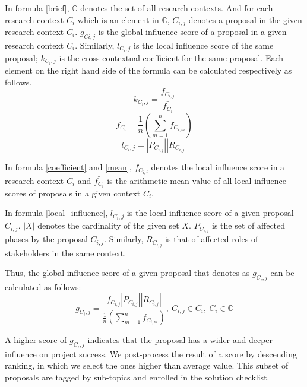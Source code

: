 In formula \ref{brief}, $\mathbb{C}$ denotes the set of all research contexts. And for each research context $C_{i}$ which is an element in $\mathbb{C}$, $C_{i,j}$ denotes a proposal in the given research context $C_{i}$. $g_{Ci,j}$ is the global influence score of a proposal in a given research context $C_{i}$. Similarly, $l_{C_{i},j}$ is the local influence score of the same proposal; $\mathit{k_{C_{i},j}}$ is the cross-contextual coefficient for the same proposal. Each element on the right hand side of the formula can be calculated respectively as follows.
\begin{equation}
\mathit{k_{C_{i},j}} = \frac{f_{C_{i,j}}}{\bar{f_{C_i}}}
\label{coefficient}
\end{equation}
\begin{equation}
\bar{f_{C_i}} = \frac{1}{n}\left (\sum_{m=1}^n{f_{C_{i,m}}}\right)
\label{mean}
\end{equation}
\begin{equation}
l_{C_{i},j} = |P_{C_{i,j}}||R_{C_{i,j}}|
\label{local_influence}
\end{equation}

In formula \ref{coefficient} and \ref{mean}, $f_{C_{i,j}}$ denotes the local influence score in a research context $C_{i}$ and $\bar{f_{C_i}}$ is the arithmetic mean value of all local influence scores of proposals in a given context $C_{i}$.

In formula \ref{local_influence}, $l_{C_{i},j}$ is the local influence score of a given proposal $C_{i,j}$. $|X|$ denotes the cardinality of the given set $X$. $P_{C_{i,j}}$ is the set of affected phases by the proposal $C_{i,j}$. Similarly, $R_{C_{i,j}}$ is that of affected roles of stakeholders in the same context.

Thus, the global influence score of a given proposal that denotes as $g_{C_{i},j}$ can be calculated as follows:
\begin{equation}
g_{C_{i},j} =
\frac
{f_{C_{i,j}} |P_{C_{i,j}}| |R_{C_{i,j}}|} 
{\frac{1}{n}\left (\sum_{m=1}^n{f_{C_{i,m}}}\right)}
,\ 
C_{i,j} \in C_{i},\ C_{i} \in \mathbb{C}
\label{final}
\end{equation}

A higher score of $g_{C_{i},j}$ indicates that the proposal has a wider and deeper influence on project success. We post-process the result of a score by descending ranking, in which we select the ones higher than average value. This subset of proposals are tagged by sub-topics and enrolled in the solution checklist.
